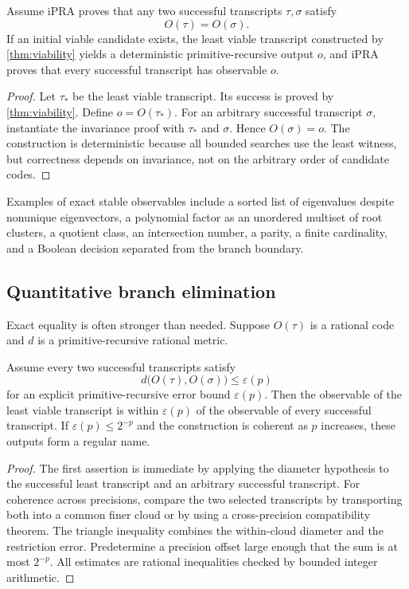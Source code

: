 \begin{theorem}\label{thm:stable-exact}
Assume iPRA proves that any two successful transcripts $\tau,\sigma$ satisfy
\[
 O(\tau)=O(\sigma).
\]
If an initial viable candidate exists, the least viable transcript constructed by \cref{thm:viability} yields a deterministic primitive-recursive output $o$, and iPRA proves that every successful transcript has observable $o$.
\end{theorem}

\begin{proof}
Let $\tau_*$ be the least viable transcript.  Its success is proved by \cref{thm:viability}.  Define $o=O(\tau_*)$.  For an arbitrary successful transcript $\sigma$, instantiate the invariance proof with $\tau_*$ and $\sigma$.  Hence $O(\sigma)=o$.  The construction is deterministic because all bounded searches use the least witness, but correctness depends on invariance, not on the arbitrary order of candidate codes.
\end{proof}

Examples of exact stable observables include a sorted list of eigenvalues despite nonunique eigenvectors, a polynomial factor as an unordered multiset of root clusters, a quotient class, an intersection number, a parity, a finite cardinality, and a Boolean decision separated from the branch boundary.

\subsection{Quantitative branch elimination}

Exact equality is often stronger than needed.  Suppose $O(\tau)$ is a rational code and $d$ is a primitive-recursive rational metric.

\begin{theorem}\label{thm:stable-approx}
Assume every two successful transcripts satisfy
\[
 d\bigl(O(\tau),O(\sigma)\bigr)\leq \varepsilon(p)
\]
for an explicit primitive-recursive error bound $\varepsilon(p)$.  Then the observable of the least viable transcript is within $\varepsilon(p)$ of the observable of every successful transcript.  If $\varepsilon(p)\leq 2^{-p}$ and the construction is coherent as $p$ increases, these outputs form a regular name.
\end{theorem}

\begin{proof}
The first assertion is immediate by applying the diameter hypothesis to the successful least transcript and an arbitrary successful transcript.  For coherence across precisions, compare the two selected transcripts by transporting both into a common finer cloud or by using a cross-precision compatibility theorem.  The triangle inequality combines the within-cloud diameter and the restriction error.  Predetermine a precision offset large enough that the sum is at most $2^{-p}$.  All estimates are rational inequalities checked by bounded integer arithmetic.
\end{proof}

